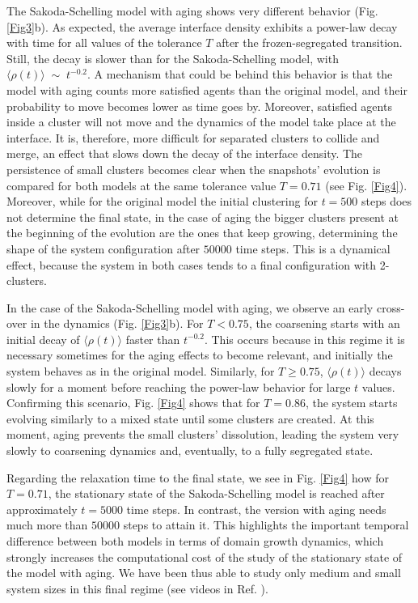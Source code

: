 The Sakoda-Schelling model with aging shows very different behavior (Fig. \ref{Fig3}b). As expected, the average interface density exhibits a power-law decay with time for all values of the tolerance $T$ after the frozen-segregated transition. Still, the decay is slower than for the Sakoda-Schelling model, with $\langle \rho (t)\rangle \; \sim \; t^{-0.2}$. A mechanism that could be behind this behavior is that the model with aging counts more satisfied agents than the original model, and their probability to move becomes lower as time goes by. Moreover, satisfied agents inside a cluster will not move and the dynamics of the model take place at the interface. It is, therefore, more difficult for separated clusters to collide and merge, an effect that slows down the decay of the interface density. The persistence of small clusters becomes clear when the snapshots' evolution is compared for both models at the same tolerance value $T = 0.71$ (see Fig. \ref{Fig4}). Moreover, while for the original model the initial clustering for $t = 500$ steps does not determine the final state, in the case of aging the bigger clusters present at the beginning of the evolution are the ones that keep growing, determining the shape of the system configuration after $50000$ time steps. This is a dynamical effect, because the system in both cases tends to a final configuration with 2-clusters.

In the case of the Sakoda-Schelling model with aging, we observe an early cross-over in the dynamics (Fig. \ref{Fig3}b). For $T < 0.75$, the coarsening starts with an initial decay of $\langle \rho (t)\rangle$ faster than $t^{-0.2}$. This occurs because in this regime it is necessary sometimes for the aging effects to become relevant, and initially the system behaves as in the original model. Similarly, for $T \ge 0.75$, $\langle \rho (t)\rangle$ decays slowly for a moment before reaching the power-law behavior for large $t$ values.  Confirming this scenario, Fig. \ref{Fig4} shows that for $T = 0.86$, the system starts evolving similarly to a mixed state until some clusters are created. At this moment, aging prevents the small clusters' dissolution, leading the system very slowly to coarsening dynamics and, eventually, to a fully segregated state. 

Regarding the relaxation time to the final state, we see in Fig. \ref{Fig4} how for $T = 0.71$, the stationary state of the Sakoda-Schelling model is reached after approximately $t = 5000$ time steps. In contrast, the version with aging needs much more than $50000$ steps to attain it. This highlights the important temporal  difference between both models in terms of domain growth dynamics, which strongly increases the computational cost of the study of the stationary state of the model with aging. We have been thus able to study only medium and small system sizes in this final regime (see videos in Ref. \cite{supplementary_Abella_2022}).

